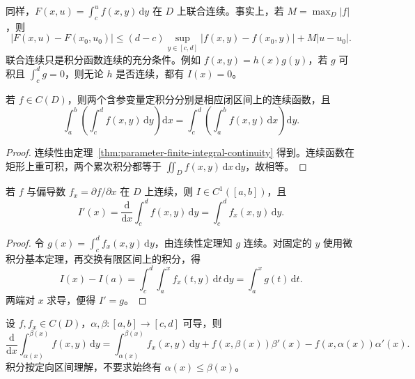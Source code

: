 同样，$F(x,u)=\int_c^u f(x,y)\,\mathrm{d}y$ 在 $D$ 上联合连续。事实上，若 $M=\max_D|f|$，则
\[
    |F(x,u)-F(x_0,u_0)|
    \leq(d-c)\sup_{y\in[c,d]}|f(x,y)-f(x_0,y)|+M|u-u_0|.
\]
联合连续只是积分函数连续的充分条件。例如 $f(x,y)=h(x)g(y)$，若 $g$ 可积且 $\int_c^d g=0$，则无论 $h$ 是否连续，都有 $I(x)=0$。

\begin{theorem}[积分次序交换]
\label{thm:parameter-finite-integration-exchange}
若 $f\in C(D)$，则两个含参变量定积分分别是相应闭区间上的连续函数，且
\begin{equation}
    \int_a^b\left(\int_c^d f(x,y)\,\mathrm{d}y\right)\mathrm{d}x
    =\int_c^d\left(\int_a^b f(x,y)\,\mathrm{d}x\right)\mathrm{d}y.
    \label{eq:parameter-finite-integration-exchange}
\end{equation}
\end{theorem}

\begin{proof}
连续性由定理~\ref{thm:parameter-finite-integral-continuity} 得到。连续函数在矩形上重可积，两个累次积分都等于 $\iint_D f(x,y)\,\mathrm{d}x\,\mathrm{d}y$，故相等。
\end{proof}

\begin{theorem}[积分号下求导]
\label{thm:parameter-finite-differentiation}
若 $f$ 与偏导数 $f_x=\partial f/\partial x$ 在 $D$ 上连续，则 $I\in C^1([a,b])$，且
\begin{equation}
    I'(x)=\frac{\mathrm{d}}{\mathrm{d}x}\int_c^d f(x,y)\,\mathrm{d}y
    =\int_c^d f_x(x,y)\,\mathrm{d}y.
    \label{eq:parameter-finite-differentiation}
\end{equation}
\end{theorem}

\begin{proof}
令 $g(x)=\int_c^d f_x(x,y)\,\mathrm{d}y$，由连续性定理知 $g$ 连续。对固定的 $y$ 使用微积分基本定理，再交换有限区间上的积分，得
\[
    I(x)-I(a)=\int_c^d\int_a^x f_x(t,y)\,\mathrm{d}t\,\mathrm{d}y
    =\int_a^x g(t)\,\mathrm{d}t.
\]
两端对 $x$ 求导，便得 $I'=g$。
\end{proof}

\begin{theorem}[变限积分的莱布尼茨公式]
\label{thm:parameter-leibniz-variable-limits}
设 $f,f_x\in C(D)$，$\alpha,\beta:[a,b]\to[c,d]$ 可导，则
\begin{equation}
    \frac{\mathrm{d}}{\mathrm{d}x}
      \int_{\alpha(x)}^{\beta(x)}f(x,y)\,\mathrm{d}y
    =\int_{\alpha(x)}^{\beta(x)}f_x(x,y)\,\mathrm{d}y
      +f(x,\beta(x))\beta'(x)-f(x,\alpha(x))\alpha'(x).
    \label{eq:parameter-leibniz-variable-limits}
\end{equation}
积分按定向区间理解，不要求始终有 $\alpha(x)\leq\beta(x)$。
\end{theorem}

